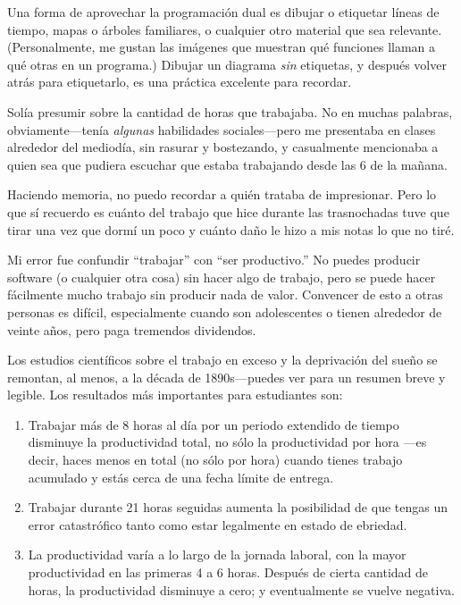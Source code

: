 Una forma de aprovechar la programación dual es dibujar o etiquetar líneas de tiempo,
mapas o árboles familiares,
o cualquier otro material que sea relevante.
(Personalmente, me gustan las imágenes que muestran qué funciones llaman a qué otras en un programa.)
Dibujar un diagrama \emph{sin} etiquetas,
y después volver atrás para etiquetarlo,
es una práctica excelente para recordar.


Solía presumir sobre la cantidad de horas que trabajaba.
No en muchas palabras,
obviamente---tenía \emph{algunas} habilidades sociales---pero
me presentaba en clases alrededor del mediodía,
sin rasurar y bostezando,
y casualmente mencionaba a quien sea que pudiera escuchar
que estaba trabajando desde las 6 de la mañana.

Haciendo memoria,
no puedo recordar a quién trataba de impresionar.
Pero lo que sí recuerdo es
cuánto del trabajo que hice durante las trasnochadas tuve que tirar una vez que dormí un poco
y cuánto daño le hizo a mis notas lo que no tiré.

Mi error fue confundir ``trabajar'' con ``ser productivo.''
No puedes producir software (o cualquier otra cosa) sin hacer algo de trabajo,
pero se puede hacer fácilmente mucho trabajo sin producir nada de valor.
Convencer de esto a otras personas es difícil,
especialmente cuando son adolescentes o tienen alrededor de veinte años,
pero paga tremendos dividendos.

Los estudios científicos sobre el trabajo en exceso y la deprivación del sueño se remontan, al menos, a la década de 1890s---puedes ver
\cite{Robi2005} para un resumen breve y legible.
Los resultados más importantes para estudiantes son:

\begin{enumerate}

\item
  Trabajar más de 8 horas al día por un periodo extendido de tiempo
  disminuye la productividad total,
  no sólo la productividad por hora ---es decir, haces menos en total (no sólo por hora)
  cuando tienes trabajo acumulado y estás cerca de una fecha límite de entrega.

\item
  Trabajar durante 21 horas seguidas aumenta la posibilidad de que tengas un error catastrófico
  tanto como estar legalmente en estado de ebriedad.

\item
  La productividad varía a lo largo de la jornada laboral,
  con la mayor productividad en las primeras 4 a 6 horas.
  Después de cierta cantidad de horas,
  la productividad disminuye a cero;
  y eventualmente se vuelve negativa.

\end{enumerate}

